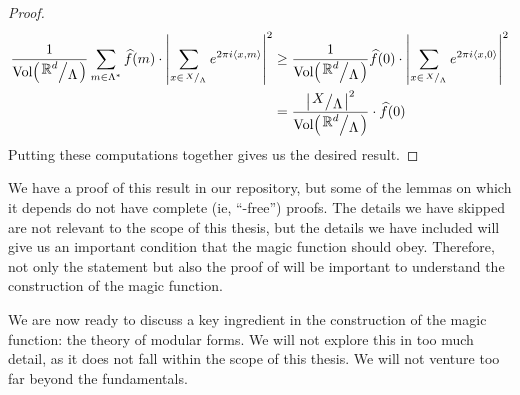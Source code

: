 \begin{proof}
    \begin{align}
        \frac{1}{\Volof{\quotient{\R^d}{\Lambda}}}\sum_{m \in \Lambda^*} \hat{f}(m) \cdot \abs{\sum_{x \in {\tiny \quotient{X}{\Lambda}}} e^{2 \pi i \cycl{x, m}}}^2
        &\geq
        \frac{1}{\Volof{\quotient{\R^d}{\Lambda}}} \hat{f}(0) \cdot \abs{\sum_{x \in {\tiny \quotient{X}{\Lambda}}} e^{2 \pi i \cycl{x, 0}}}^2 \label{Ch2:Eq:CohnElkies_Ineq_4} \\
        &= \frac{\abs{\quotient{X}{\Lambda}}^2}{\Volof{\quotient{\R^d}{\Lambda}}} \cdot \hat{f}(0) \nonumber
    \end{align}
    Putting these computations together gives us the desired result.
\end{proof}

We have a proof of this result in our repository, but some of the lemmas on which it depends do not have complete (ie, ``\sorry-free'') proofs. The details we have skipped are not relevant to the scope of this thesis, but the details we have included will give us an important condition that the magic function should obey. Therefore, not only the statement but also the proof of  will be important to understand the construction of the magic function.

We are now ready to discuss a key ingredient in the construction of the magic function: the theory of modular forms. We will not explore this in too much detail, as it does not fall within the scope of this thesis. We will not venture too far beyond the fundamentals.